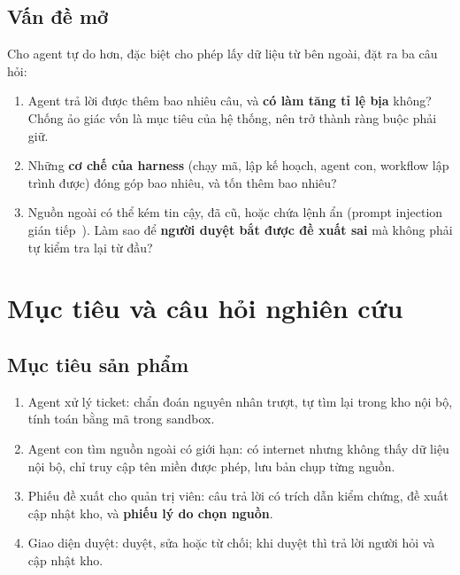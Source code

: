 \documentclass[11pt,a4paper]{article}
\begin{document}
\subsection{Vấn đề mở}
Cho agent tự do hơn, đặc biệt cho phép lấy dữ liệu từ bên ngoài, đặt ra ba câu hỏi:
\begin{enumerate}
  \item Agent trả lời được thêm bao nhiêu câu, và \textbf{có làm tăng tỉ lệ bịa} không? Chống ảo giác vốn
        là mục tiêu của hệ thống, nên trở thành ràng buộc phải giữ.
  \item Những \textbf{cơ chế của harness} (chạy mã, lập kế hoạch, agent con, workflow lập trình được) đóng
        góp bao nhiêu, và tốn thêm bao nhiêu?
  \item Nguồn ngoài có thể kém tin cậy, đã cũ, hoặc chứa lệnh ẩn (prompt injection gián
        tiếp~\cite{greshake}). Làm sao để \textbf{người duyệt bắt được đề xuất sai} mà không phải tự
        kiểm tra lại từ đầu?
\end{enumerate}

\section{Mục tiêu và câu hỏi nghiên cứu}

\subsection{Mục tiêu sản phẩm}
\begin{enumerate}[label=P\arabic*.]
  \item Agent xử lý ticket: chẩn đoán nguyên nhân trượt, tự tìm lại trong kho nội bộ, tính toán bằng mã
        trong sandbox.
  \item Agent con tìm nguồn ngoài có giới hạn: có internet nhưng không thấy dữ liệu nội bộ, chỉ truy cập tên
        miền được phép, lưu bản chụp từng nguồn.
  \item Phiếu đề xuất cho quản trị viên: câu trả lời có trích dẫn kiểm chứng, đề xuất cập nhật kho, và
        \textbf{phiếu lý do chọn nguồn}.
  \item Giao diện duyệt: duyệt, sửa hoặc từ chối; khi duyệt thì trả lời người hỏi và cập nhật kho.
\end{enumerate}
\end{document}

